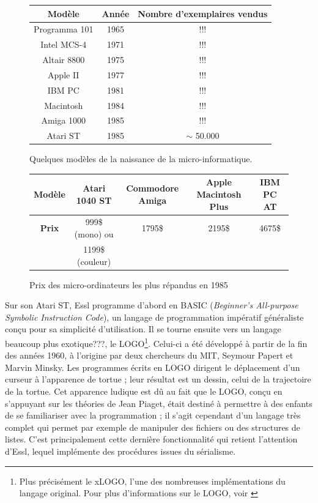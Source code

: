 \documentclass[a4paper,12pt]{article}
\begin{document}
\begin{figure}[h!]
\begin{center}
\begin{tabular}{|c|c|c|}
\hline
\textbf{Modèle} & \textbf{Année} & \textbf{Nombre d'exemplaires vendus} \\
\hline
Programma 101 & 1965 & !!! \\
\hline
Intel MCS-4 & 1971 & !!! \\
\hline
Altair 8800 & 1975 & !!! \\
\hline
Apple II & 1977 & !!! \\
\hline
IBM PC & 1981 & !!! \\ %
\hline
Macintosh & 1984 & !!! \\
\hline
Amiga 1000 & 1985 & !!! \\
\hline
Atari ST & 1985 & $\sim$ 50.000 \\
\hline
\end{tabular}
\caption{Quelques modèles de la naissance de la micro-informatique.}
\label{micropc}
\end{center}
\end{figure}

\begin{figure}[h!]
\begin{center}
\begin{tabular}{|c|c|c|c|c|}
\hline
\textbf{Modèle} & Atari 1040 ST & Commodore Amiga & Apple Macintosh Plus & IBM PC AT \\
\hline
\textbf{Prix} & 999\$ (mono) ou & 1795\$ & 2195\$ & 4675\$ \\
& 1199\$ (couleur) & & & \\
\hline
\end{tabular}
\caption{Prix des micro-ordinateurs les plus répandus en 1985}
\label{prixpc}
\end{center}
\end{figure}

Sur son Atari ST, Essl programme d'abord en BASIC (\emph{Beginner's All-purpose Symbolic Instruction Code}), un langage de programmation impératif généraliste conçu pour sa simplicité d'utilisation. Il se tourne ensuite vers un langage beaucoup plus exotique???, le LOGO\footnote{Plus précisément le xLOGO, l'une des nombreuses implémentations du langage original. Pour plus d'informations sur le LOGO, voir \cite{harvey1985computer}}. Celui-ci a été développé à partir de la fin des années 1960, à l'origine par deux chercheurs du MIT, Seymour Papert et Marvin Minsky. Les programmes écrits en LOGO dirigent le déplacement d'un curseur à l'apparence de tortue ; leur résultat est un dessin, celui de la trajectoire de la tortue. Cet apparence ludique est dû au fait que le LOGO, conçu en s'appuyant sur les théories de Jean Piaget, était destiné à permettre à des enfants de se familiariser avec la programmation ; il s'agit cependant d'un langage très complet qui permet par exemple de manipuler des fichiers ou des structures de listes. C'est principalement cette dernière fonctionnalité qui retient l'attention d'Essl, lequel implémente des procédures issues du sérialisme.
\end{document}
